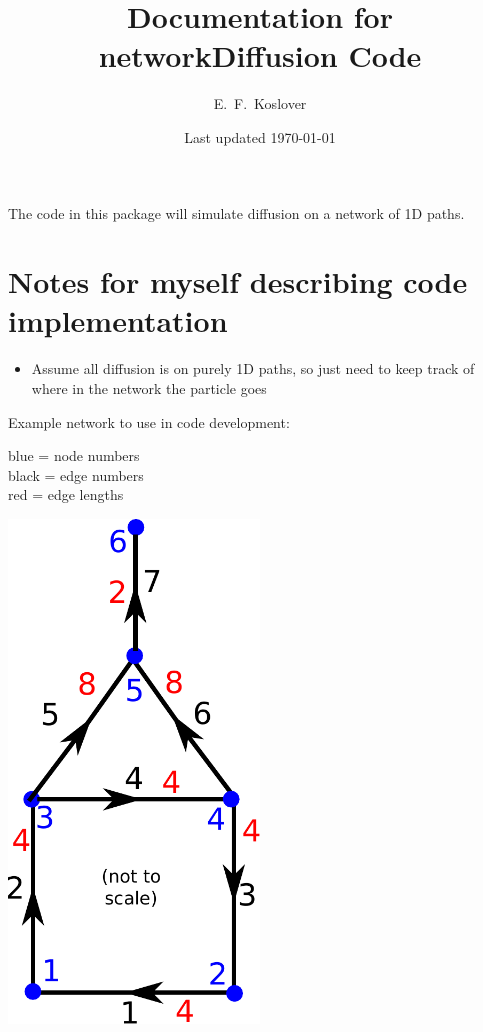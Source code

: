 \documentclass[12pt]{article}
\begin{document}
\title{\vspace{-2cm}Documentation for networkDiffusion Code}
\author{E.~F.~Koslover}
\date{Last updated \today}
\maketitle

The code in this package will simulate diffusion on a network of 1D paths.


\section*{Notes for myself describing code implementation}

\begin{itemize}
	\item Assume all diffusion is on purely 1D paths, so just need to keep track of where in the network the particle goes	
\end{itemize}

\begin{minipage}{0.5\textwidth}
Example network to use in code development:

{\color{blue} blue} = node numbers \\
black = edge numbers \\
{\color{red} red} = edge lengths

\end{minipage}
\begin{minipage}{0.2\textwidth}
	\end{minipage}
\begin{minipage}{0.3\textwidth}
\centerline{\includegraphics[width=0.5\textwidth]{example1network.pdf}}
\end{minipage}
\newpage
\end{document}

